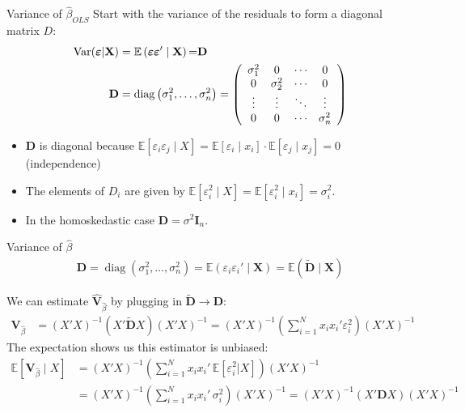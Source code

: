 \begin{frame}{Variance of $\widehat{\beta}_{OLS}$}
Start with the variance of the residuals to form a \alert{diagonal} matrix $D$:
\begin{align*}
\operatorname { Var } ( \boldsymbol{\varepsilon} | \mathbf { X } ) &= \mathbb { E } \left( \boldsymbol{\varepsilon \varepsilon} ^ { \prime } \mid \mathbf { X } \right){ = } \mathbf { D }\\
\mathbf { D } &= \operatorname { diag } \left( \sigma _ { 1 } ^ { 2 } , \ldots , \sigma _ { n } ^ { 2 } \right) = \left( \begin{array} { c c c c } { \sigma _ { 1 } ^ { 2 } } & { 0 } & { \cdots } & { 0 } \\ { 0 } & { \sigma _ { 2 } ^ { 2 } } & { \cdots } & { 0 } \\ { \vdots } & { \vdots } & { \ddots } & { \vdots } \\ { 0 } & { 0 } & { \cdots } & { \sigma _ { n } ^ { 2 } } \end{array} \right)
\end{align*}
\begin{itemize}
\item $\mathbf{D}$ is diagonal because $\mathbb { E }[\varepsilon_i \varepsilon_j \mid  X] = \mathbb { E }[\varepsilon_i  \mid x_i] \cdot \mathbb { E }[\varepsilon_j  \mid  x_j]=0$ (independence)
\item The elements of $D_i$ are given by $\mathbb { E }[\varepsilon_i^2 \mid  X] = \mathbb { E }[\varepsilon_i^2 \mid x_i] = \sigma_i^2$.
\item In the \alert{homoskedastic} case $\mathbf{D} = \sigma^2 \mathbf{I}_n$.
\end{itemize}
\end{frame}


\begin{frame}{Variance of $\widehat{\beta}$}
\small
\begin{align*}
\mathbf { D } = \operatorname { diag } \left( \sigma _ { 1 } ^ { 2 } , \ldots , \sigma _ { n } ^ { 2 } \right)
= \mathbb { E } \left( \varepsilon_i \varepsilon_i'  \mid \mathbf { X } \right)
= \mathbb { E } \left( \widetilde{\mathbf{D}} \mid  \mathbf { X } \right)
\end{align*}

We can estimate $\widehat{\mathbf{V}}_{\widehat{\beta}}$ by plugging in $\widetilde{\mathbf{D}} \rightarrow \mathbf{D}$:
\begin{align*}
\mathbf{V}_{\widehat{\beta}} &= (X'X)^{-1} (X'  \widetilde{\mathbf{D}} X) (X'X)^{-1}
= (X'X)^{-1} \left(\sum_{i=1}^N x_i x_i' \varepsilon_i^2  \right) (X'X)^{-1} 
\end{align*}
The expectation shows us this estimator is unbiased:
\begin{align*}
\mathbb{E}[\mathbf{V}_{\widehat{\beta}} \mid X] &= (X'X)^{-1} \left(\sum_{i=1}^N x_i x_i'\, \mathbb{E}[\varepsilon_i^2 | X] \right) (X'X)^{-1} \\
&= (X'X)^{-1} \left(\sum_{i=1}^N x_i x_i' \, \sigma_i^2 \right) (X'X)^{-1} = (X'X)^{-1} (X' \mathbf{D} X) (X'X)^{-1} 
\end{align*}
\end{frame}




